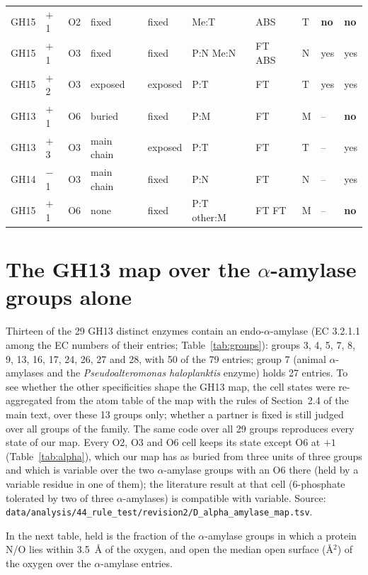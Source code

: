 \documentclass[preprint,12pt]{elsarticle}
\begin{document}
\begin{table}[h]
\begin{tabular}{lllllp{2.9cm}p{1.2cm}lll}
GH15 & $+$1 & O2 & fixed & fixed & Me:T & ABS & T & \textbf{no} & \textbf{no}\\
GH15 & $+$1 & O3 & fixed & fixed & P:N Me:N & FT ABS & N & yes & yes\\
GH15 & $+$2 & O3 & exposed & exposed & P:T & FT & T & yes & yes\\
GH13 & $+$1 & O6 & buried & fixed & P:M & FT & M & -- & \textbf{no}\\
GH13 & $+$3 & O3 & main chain & exposed & P:T & FT & T & -- & yes\\
GH14 & $-$1 & O3 & main chain & fixed & P:N & FT & N & -- & yes\\
GH15 & $+$1 & O6 & none & fixed & P:T other:M & FT FT & M & -- & \textbf{no}\\
\bottomrule
\end{tabular}
\end{table}

\section{The GH13 map over the $\alpha$-amylase groups alone}\label{sec:alpha}
Thirteen of the 29 GH13 distinct enzymes contain an endo-$\alpha$-amylase (EC 3.2.1.1 among the EC numbers of their
entries; Table~\ref{tab:groups}): groups 3, 4, 5, 7, 8, 9, 13, 16, 17, 24, 26, 27 and 28, with 50 of the 79 entries;
group 7 (animal $\alpha$-amylases and the \emph{Pseudoalteromonas haloplanktis} enzyme) holds 27 entries. To see whether
the other specificities shape the GH13 map, the cell states were re-aggregated from the atom table of the map with the
rules of Section~2.4 of the main text, over these 13 groups only; whether a partner is fixed is still judged over all
groups of the family. The same code over all 29 groups reproduces every state of our map. Every O2, O3 and
O6 cell keeps its state except O6 at $+1$ (Table~\ref{tab:alpha}), which our map has as buried from three
units of three groups and which is variable over the two $\alpha$-amylase groups with an O6 there (held by a variable
residue in one of them); the literature result at that cell (6-phosphate tolerated by two of three
$\alpha$-amylases) is compatible with variable. Source: \texttt{data/analysis/44\_rule\_test/}\allowbreak\texttt{revision2/D\_alpha\_amylase\_map.tsv}.

In the next table, held is the fraction of the $\alpha$-amylase groups in which a protein N/O lies within 3.5~\AA{} of the oxygen, and open the median open surface (\AA$^2$) of the oxygen over the $\alpha$-amylase entries.
\end{document}
